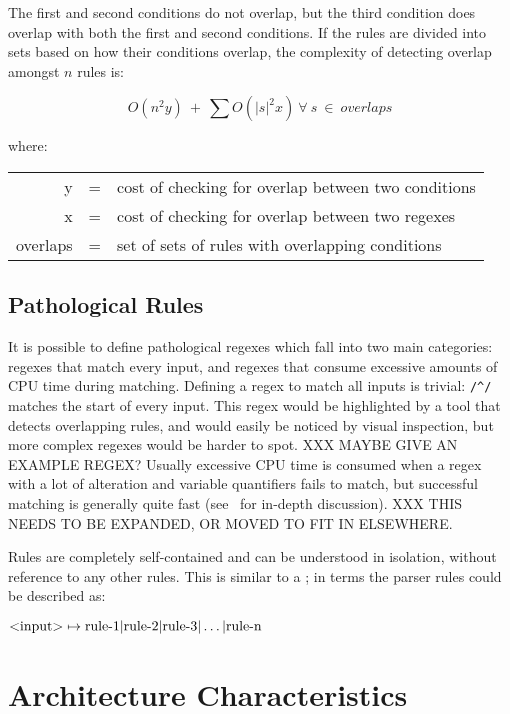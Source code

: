 \noindent{}The first and second conditions do not overlap, but the third
condition does overlap with both the first and second conditions.  If the
rules are divided into sets based on how their conditions overlap, the
complexity of detecting overlap amongst $n$ rules is:

$$O(n^{2}y)~+~\sum{O(|s|^{2}x)~\forall{}~s~\in{}~overlaps}$$

where:

\begin{tabular}[]{rcl}

            y & = & cost of checking for overlap between two conditions \\
            x & = & cost of checking for overlap between two regexes    \\
     overlaps & = & set of sets of rules with overlapping conditions    \\

\end{tabular}

\subsection{Pathological Rules}

It is possible to define pathological regexes which fall into two main
categories: regexes that match every input, and regexes that consume
excessive amounts of CPU time during matching.  Defining a regex to match
all inputs is trivial: \verb!/^/! matches the start of every input.  This
regex would be highlighted by a tool that detects overlapping rules, and
would easily be noticed by visual inspection, but more complex regexes
would be harder to spot.  XXX MAYBE GIVE AN EXAMPLE REGEX\@?  Usually
excessive CPU time is consumed when a regex with a lot of alteration and
variable quantifiers fails to match, but successful matching is generally
quite fast (see~\cite{mastering-regular-expressions} for in-depth
discussion).  XXX THIS NEEDS TO BE EXPANDED, OR MOVED TO FIT IN
ELSEWHERE\@.

    Rules are completely self-contained and can be understood in
        isolation, without reference to any other rules.  This is similar
        to a ; in  terms the parser rules could
        be described as:

        $\text{\textless{}input\textgreater{}} \mapsto \text{rule-1} |
        \text{rule-2} | \text{rule-3} | \dots | \text{rule-n}$

\section{Architecture Characteristics}

